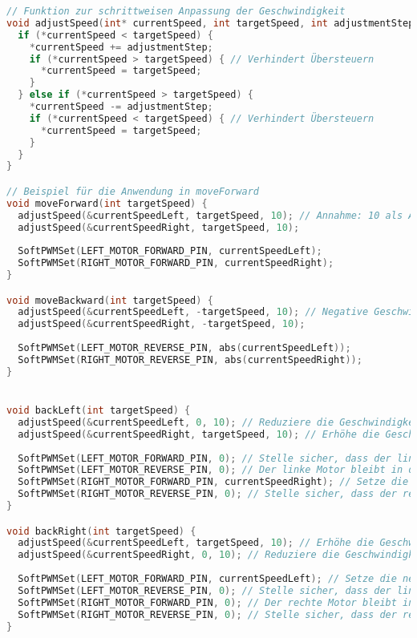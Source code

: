 \documentclass{vorlage-design-main}
\begin{document}
\begin{lstlisting}[language={C++}]
// Funktion zur schrittweisen Anpassung der Geschwindigkeit
void adjustSpeed(int* currentSpeed, int targetSpeed, int adjustmentStep) {
  if (*currentSpeed < targetSpeed) {
    *currentSpeed += adjustmentStep;
    if (*currentSpeed > targetSpeed) { // Verhindert Übersteuern
      *currentSpeed = targetSpeed;
    }
  } else if (*currentSpeed > targetSpeed) {
    *currentSpeed -= adjustmentStep;
    if (*currentSpeed < targetSpeed) { // Verhindert Übersteuern
      *currentSpeed = targetSpeed;
    }
  }
}

// Beispiel für die Anwendung in moveForward
void moveForward(int targetSpeed) {
  adjustSpeed(&currentSpeedLeft, targetSpeed, 10); // Annahme: 10 als Anpassungsschritt
  adjustSpeed(&currentSpeedRight, targetSpeed, 10);
  
  SoftPWMSet(LEFT_MOTOR_FORWARD_PIN, currentSpeedLeft);
  SoftPWMSet(RIGHT_MOTOR_FORWARD_PIN, currentSpeedRight);
}

void moveBackward(int targetSpeed) {
  adjustSpeed(&currentSpeedLeft, -targetSpeed, 10); // Negative Geschwindigkeit für Rückwärts
  adjustSpeed(&currentSpeedRight, -targetSpeed, 10);
  
  SoftPWMSet(LEFT_MOTOR_REVERSE_PIN, abs(currentSpeedLeft));
  SoftPWMSet(RIGHT_MOTOR_REVERSE_PIN, abs(currentSpeedRight));
}


void backLeft(int targetSpeed) {
  adjustSpeed(&currentSpeedLeft, 0, 10); // Reduziere die Geschwindigkeit des linken Motors auf 0
  adjustSpeed(&currentSpeedRight, targetSpeed, 10); // Erhöhe die Geschwindigkeit des rechten Motors
  
  SoftPWMSet(LEFT_MOTOR_FORWARD_PIN, 0); // Stelle sicher, dass der linke Motor nicht vorwärts läuft
  SoftPWMSet(LEFT_MOTOR_REVERSE_PIN, 0); // Der linke Motor bleibt in diesem Fall gestoppt
  SoftPWMSet(RIGHT_MOTOR_FORWARD_PIN, currentSpeedRight); // Setze die neue Geschwindigkeit für den rechten Motor
  SoftPWMSet(RIGHT_MOTOR_REVERSE_PIN, 0); // Stelle sicher, dass der rechte Motor nicht rückwärts läuft
}

void backRight(int targetSpeed) {
  adjustSpeed(&currentSpeedLeft, targetSpeed, 10); // Erhöhe die Geschwindigkeit des linken Motors
  adjustSpeed(&currentSpeedRight, 0, 10); // Reduziere die Geschwindigkeit des rechten Motors auf 0
  
  SoftPWMSet(LEFT_MOTOR_FORWARD_PIN, currentSpeedLeft); // Setze die neue Geschwindigkeit für den linken Motor
  SoftPWMSet(LEFT_MOTOR_REVERSE_PIN, 0); // Stelle sicher, dass der linke Motor nicht rückwärts läuft
  SoftPWMSet(RIGHT_MOTOR_FORWARD_PIN, 0); // Der rechte Motor bleibt in diesem Fall gestoppt
  SoftPWMSet(RIGHT_MOTOR_REVERSE_PIN, 0); // Stelle sicher, dass der rechte Motor nicht rückwärts läuft
}



\end{lstlisting}
\end{document}
